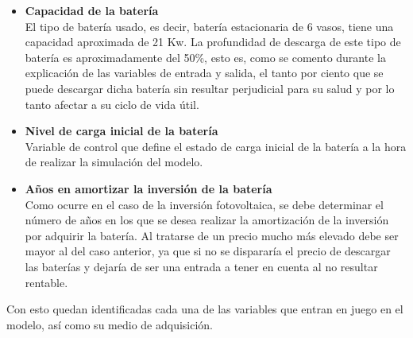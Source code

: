 \begin{itemize}
	\item \textbf{Capacidad de la batería}\\ El tipo de batería usado, es decir, batería estacionaria de 6 vasos, tiene una capacidad aproximada de 21 Kw. La profundidad de descarga de este tipo de batería es aproximadamente del 50\%, esto es, como se comento durante la explicación de las variables de entrada y salida, el tanto por ciento que se puede descargar dicha batería sin resultar perjudicial para su salud y por lo tanto afectar a su ciclo de vida útil.
	\item \textbf{Nivel de carga inicial de la batería}\\ Variable de control que define el estado de carga inicial de la batería a la hora de realizar la simulación del modelo.
	\item \textbf{Años en amortizar la inversión de la batería}\\ Como ocurre en el caso de la inversión fotovoltaica, se debe determinar el número de años en los que se desea realizar la amortización de la inversión por adquirir la batería. Al tratarse de un precio mucho más elevado debe ser mayor al del caso anterior, ya que si no se dispararía el precio de descargar las baterías y dejaría de ser una entrada a tener en cuenta al no resultar rentable.
\end{itemize}
Con esto quedan identificadas cada una de las variables que entran en juego en el modelo, así como su medio de adquisición.
